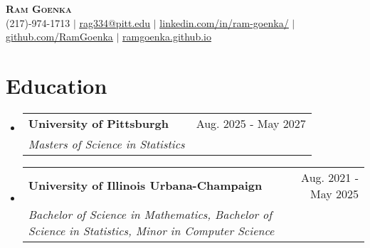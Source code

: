 \documentclass[letterpaper,11pt]{article}
\makeatletter
\newcommand{\resumeEduchead}[4]{
  \vspace{-2pt}\item
    \begin{tabular*}{0.97\textwidth}[t]{l@{\extracolsep{\fill}}r}
      \textbf{#1} & #2 \\
      \textit{\small#3} & \textit{\small #4} \\
    \end{tabular*}\vspace{-7pt}}
\newcommand{\resumeSubHeadingListStart}{\begin{itemize}[leftmargin=0.15in, label={}]}
\newcommand{\resumeSubHeadingListEnd}{\end{itemize}}
\makeatother
\begin{document}
\begin{center}
    \textbf{\Huge \scshape Ram Goenka} \\ \vspace{1pt}
    \small (217)-974-1713 $|$ \href{mailto:rgoenka2@illinois.edu}{\color{blue}\underline{rag334@pitt.edu}} $|$ 
    \href{https://www.linkedin.com/in/ram-goenka/}{\color{blue}\underline{linkedin.com/in/ram-goenka/}} $|$
    \href{https://github.com/RamGoenka}{\color{blue}\underline{github.com/RamGoenka}} $|$
    \href{http://ramgoenka.github.io/}{\color{blue}\underline{ramgoenka.github.io}}
\end{center}
\section{Education}
  \resumeSubHeadingListStart
    \resumeEduchead
      {University of Pittsburgh}{Aug. 2025 - May 2027}
      {Masters of Science in Statistics}{~~}
    \resumeEduchead
      {University of Illinois Urbana-Champaign}{Aug. 2021 - May 2025}
      {Bachelor of Science in Mathematics, Bachelor of Science in Statistics, Minor in Computer Science}{~~}
  \resumeSubHeadingListEnd
\end{document}
